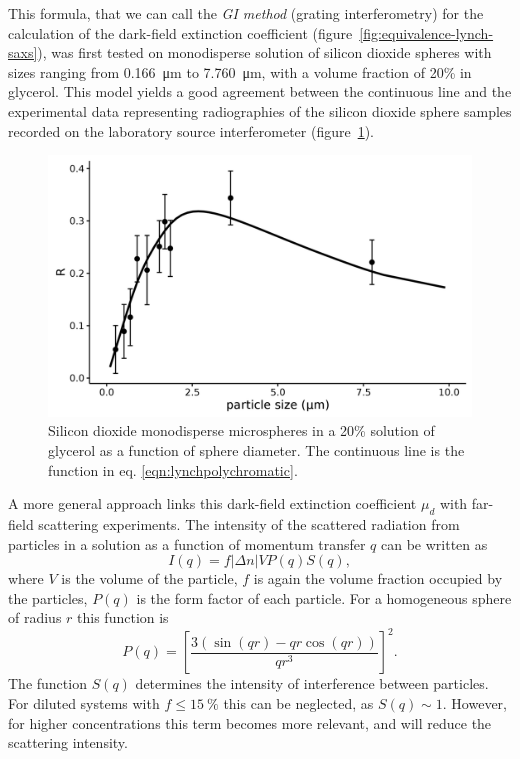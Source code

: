 This formula, that we can call the \emph{GI method} (grating interferometry) for the calculation of
the dark-field extinction coefficient (figure~\ref{fig:equivalence-lynch-saxs}), was first tested on monodisperse solution of silicon dioxide
spheres with sizes ranging from \SI{0.166}{\micro\meter} to
\SI{7.760}{\micro\meter}, with a volume fraction of 20\%
in glycerol. This model yields a good agreement between the continuous line
and the experimental data representing radiographies of the silicon dioxide
sphere samples recorded on the laboratory source interferometer (figure~\ref{725462}).
\begin{figure}[h!]
\begin{center}
\includegraphics[width=0.70\columnwidth]{gfx/lung-paper-figures/summary/summary}
\caption[Dark-field signals for silicon microspheres.]{Silicon dioxide monodisperse microspheres in a 20\% solution of
    glycerol as a function of sphere diameter. The continuous line is the
    function in eq. {\ref{eqn:lynchpolychromatic}}.
    {\label{725462}}}
\end{center}
\end{figure}

A more general approach links this dark-field extinction coefficient
$\mu_d$ with far-field scattering experiments.
The intensity of the scattered radiation from particles in a solution as a
function of momentum transfer $q$ can be written as~\parencite{PEDERSEN1997171,Gkoumas2016}
\begin{equation}
    I(q) = f|\Delta n| V P(q) S(q),
    \label{eq:scattering.intensity}
\end{equation}
where $V$ is the volume of the particle, $f$ is again the volume fraction
occupied by the particles, $P(q)$ is the form factor of each particle. For a
homogeneous sphere of radius $r$ this function is~\parencite{PEDERSEN1997171}
\begin{equation}
    P(q) = \left[\frac{3(\sin(qr) - qr\cos(qr))}{qr^3}\right]^2.
    \label{eq:sphere.form.factor}
\end{equation}
The function $S(q)$ determines the intensity of interference between
particles. For diluted systems with $f \leq \SI{15}{\percent}$ this can
be neglected, as $S(q) \sim 1$. However, for higher concentrations this term
becomes more relevant, and will reduce the scattering intensity.

